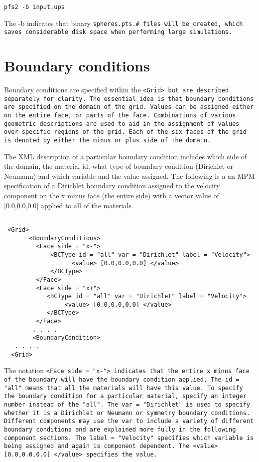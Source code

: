 \begin{Verbatim}[fontsize=\footnotesize]
   pfs2 -b input.ups
\end{Verbatim}

The -b indicates that binary \tt spheres.pts.\# \normalfont files will be created, which
saves considerable disk space when performing large simulations.


\section{Boundary conditions}

Boundary conditions are specified within the \tt <Grid> \normalfont
but are described separately for clarity.  The essential idea is that
boundary conditions are specified on the domain of the grid.  Values
can be assigned either on the entire face, or parts of the face.
Combinations of various geometric descriptions are used to aid in the
assignment of values over specific regions of the grid.  Each of the
six faces of the grid is denoted by either the minus or plus side of
the domain.

The XML description of a particular boundary condition includes which
side of the domain, the material id, what type of boundary condition
(Dirichlet or Neumann) and which variable and the value assigned.  The
following is a an MPM specification of a Dirichlet boundary condition
assigned to the velocity component on the x minus face (the entire
side) with a vector value of [0.0,0.0,0.0] applied to all of the materials.

\begin{Verbatim}[fontsize=\footnotesize]

 <Grid>
       <BoundaryConditions>
         <Face side = "x-">
             <BCType id = "all" var = "Dirichlet" label = "Velocity">
                   <value> [0.0,0.0,0.0] </value>
             </BCType>
         </Face>
         <Face side = "x+">
            <BCType id = "all" var = "Dirichlet" label = "Velocity">
                 <value> [0.0,0.0,0.0] </value>
            </BCType>
         </Face>
        . . . .
        <BoundaryCondition>
   . . . .
  <Grid>

\end{Verbatim}

The notation \tt <Face side = "x-"> \normalfont indicates that the
entire x minus face of the boundary will have the boundary condition
applied.  The \tt id = "all" \normalfont means that all the
materials will have this value.  To specify the boundary condition for
a particular material, specify an integer number instead of the
"all".  The \tt var = "Dirichlet" \normalfont is used to specify
whether it is a Dirichlet or Neumann or symmetry boundary conditions.
Different components may use the \tt var \normalfont to include a
variety of different boundary conditions and are explained more fully
in the following component sections.  The \tt label = "Velocity"
\normalfont specifies which variable is being assigned and again is
component dependent.  The \tt <value> [0.0,0.0,0.0] </value>
\normalfont specifies the value.

